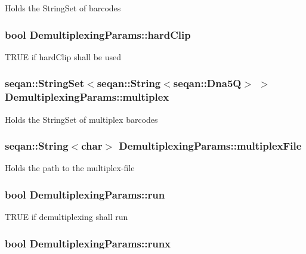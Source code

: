 Holds the String\-Set of barcodes \hypertarget{struct_demultiplexing_params_a28920791fd2dfa590dade23f2924b93a}{
\subsubsection[{hard\-Clip}]{\setlength{\rightskip}{0pt plus 5cm}bool Demultiplexing\-Params\-::hard\-Clip}}\label{struct_demultiplexing_params_a28920791fd2dfa590dade23f2924b93a}
T\-R\-U\-E if hard\-Clip shall be used \hypertarget{struct_demultiplexing_params_a6d5a685bccab390519e4b423018443f7}{
\subsubsection[{multiplex}]{\setlength{\rightskip}{0pt plus 5cm}seqan\-::\-String\-Set$<$seqan\-::\-String$<$seqan\-::\-Dna5\-Q$>$ $>$ Demultiplexing\-Params\-::multiplex}}\label{struct_demultiplexing_params_a6d5a685bccab390519e4b423018443f7}
Holds the String\-Set of multiplex barcodes \hypertarget{struct_demultiplexing_params_a93d9e02c35225dac383b7c52f7b539f7}{
\subsubsection[{multiplex\-File}]{\setlength{\rightskip}{0pt plus 5cm}seqan\-::\-String$<$char$>$ Demultiplexing\-Params\-::multiplex\-File}}\label{struct_demultiplexing_params_a93d9e02c35225dac383b7c52f7b539f7}
Holds the path to the multiplex-\/file \hypertarget{struct_demultiplexing_params_a4a52e0b0dbbacf3e1d4e2b115f3d8cf7}{
\subsubsection[{run}]{\setlength{\rightskip}{0pt plus 5cm}bool Demultiplexing\-Params\-::run}}\label{struct_demultiplexing_params_a4a52e0b0dbbacf3e1d4e2b115f3d8cf7}
T\-R\-U\-E if demultiplexing shall run \hypertarget{struct_demultiplexing_params_aa7bf93a371b34c9ad7ae0a5dc8edc8c5}{
\subsubsection[{runx}]{\setlength{\rightskip}{0pt plus 5cm}bool Demultiplexing\-Params\-::runx}}\label{struct_demultiplexing_params_aa7bf93a371b34c9ad7ae0a5dc8edc8c5}
